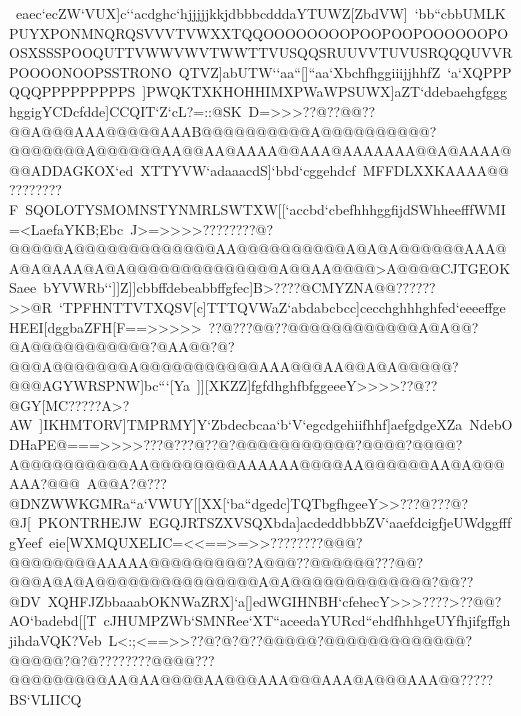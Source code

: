  \hbox{\vbox{\halftone\offinterlineskip %
 \hbox{eaec`ecZW`VUX]c``acdghc`hjjjjjkkjdbbbcdddaYTUWZ[ZbdVW]%
 `bb``cbbUMLKPUYXPONMNQRQSVVVTVWXXTQQOOOOOOOOPOOPOOPOOOOOOPOOSXSSSPOOQUTTVWWVWVTWWTTVUSQQSRUUVVTUVUSRQQQUVVRPOOOONOOPSSTRONO%
 QTVZ]abUTW``aa``[]``aa`XbchfhggiiijjhhfZ%
 `a`XQPPPQQQPPPPPPPPPS}
 \hbox{]PWQKTXKHOHHIMXPWaWPSUWX]aZT`ddebaehgfggghggigYCDcfdde]CCQIT`Z`cL?=::@SK%
 D=>>>??@??@@??@@A@@@AAA@@@@@AAAB@@@@@@@@@@A@@@@@@@@@@?@@@@@@@A@@@@@@AA@@AA@AAAA@@AAA@AAAAAAA@@A@AAAA@@@ADDAGKOX`ed%
 XTTYVW`adaaacdS]`bbd`cggehdcf%
 MFFDLXXKAAAA@@????????F}
 \hbox{SQOLOTYSMOMNSTYNMRLSWTXW[[`accbd`cbefhhhggfijdSWhheefffWMI=<LaefaYKB;Ebc%
 J>=>>>>????????@?@@@@@A@@@@@@@@@@@@@AA@@@@@@@@@@A@A@A@@@@@@AAA@A@A@AAA@A@A@@@@@@@@@@@@@@A@@AA@@@@>A@@@@CJTGEOKSaee%
 bYVWRb``]]Z]]cbbffdebeabbffgfec]B>????@CMYZNA@@??????>>@R}
 \hbox{`TPFHNTTVTXQSV[c]TTTQVWaZ`abdabcbcc]cecchghhhghfed`eeeeffgeHEEI[dggbaZFH[F==>>>>>%
 ??@???@@??@@@@@@@@@@@@A@A@@?@A@@@@@@@@@@@?@AA@@?@?@@@A@@@@@@@A@@@@@@@@@@@AAA@@@AA@@A@A@@@@@?@@@AGYWRSPNW]bc```[Ya%
 ]][XKZZ]fgfdhghfbfggeeeY>>>>??@??@GY[MC?????A>?AW}
 \hbox{]IKHMTORV]TMPRMY]Y`Zbdecbcaa`b`V`egcdgehiifhhf]aefgdgeXZa%
 NdebODHaPE@===>>>>???@???@??@?@@@@@@@@@@@?@@@@?@@@@?A@@@@@@@@@@AA@@@@@@@@AAAAAA@@@@AA@@@@@@AA@A@@@AAA?@@@%
 A@@A?@???@DNZWWKGMRa``a`VWUY[[XX[`ba``dgedc]TQTbgfhgeeY>>???@???@?@J[%
 PKONTRHEJW}
 \hbox{EGQJRTSZXVSQXbda]acdeddbbbZV`aaefdcigfjeUWdggfffgYeef%
 eie[WXMQUXELIC=<<==>=>>????????@@@?@@@@@@@@AAAAA@@@@@@@@@?A@@@??@@@@@@???@@?@@@A@A@A@@@@@@@@@@@@@@@A@A@@@@@@@@@@@@@?@@??@DV%
 XQHFJZbbaaabOKNWaZRX]`a[]edWGIHNBH`cfehecY>>>????>??@@?AO`badebd[[T}
 \hbox{cJHUMPZWb`SMNRee`XT``aceedaYURcd``ehdfhhhgeUYfhjifgffghjihdaVQK?Veb%
 L<:;<==>>??@?@?@??@@@@@?@@@@@@@@@@@@@?@@@@@?@?@????????@@@@???@@@@@@@@@AA@AA@@@@AA@@@AAA@@@AAA@A@@@AAA@@?????BS`VLIICQ%
}}}
